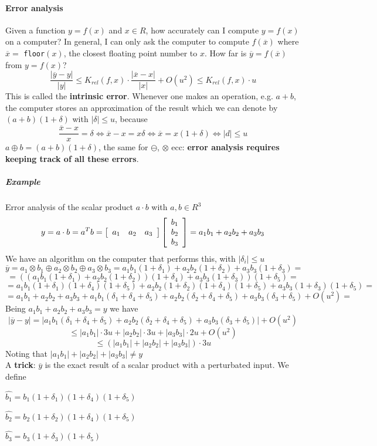 \documentclass[10pt]{report}
\begin{document}
\paragraph{Error analysis} Given a function $y = f(x)$ and $x\in R$, how accurately can I compute $y=f(x)$ on a computer? In general, I can only ask the computer to compute $f(\overline{x})$ where $\overline{x} =$ \texttt{floor}$(x)$, the closest floating point number to $x$. How far is $\overline{y}=f(\overline{x})$ from $y=f(x)$?
$$\frac{|\overline{y}-y|}{|y|}\leq K_{rel}(f,x)\cdot\frac{|\overline{x}-x|}{|x|} + O(u^2)\leq K_{rel}(f,x)\cdot u$$
This is called the \textbf{intrinsic error}. Whenever one makes an operation, e.g. $a+b$, the computer stores an approximation of the result which we can denote by $(a+b)(1+\delta)$ with $|\delta|\leq u$, because $$\frac{\overline{x}-x}{x} = \delta \Leftrightarrow \overline{x} - x = x\delta \Leftrightarrow \overline{x} = x(1+\delta) \Leftrightarrow |d|\leq u$$
$a\oplus b = (a+b)(1+\delta)$, the same for $\ominus$, $\otimes$ ecc: \textbf{error analysis requires keeping track of all these errors}.
\subparagraph{Example} Error analysis of the scalar product $a\cdot b$ with $a,b \in R^3$
$$y = a\cdot b = a^Tb = \left[\begin{array}{c c c}
a_1 & a_2 & a_3
\end{array}\right] \left[\begin{array}{c}
b_1\\b_2\\b_3
\end{array}\right]=a_1b_1+a_2b_2+a_3b_3$$
We have an algorithm on the computer that performs this, with $|\delta_i|\leq u$ $$\overline{y} = a_1\otimes b_1\oplus a_2\otimes b_2\oplus a_3\otimes b_3 = a_1b_1(1+\delta_1)+a_2b_2(1+\delta_2)+a_3b_3(1+\delta_3) = $$
$$ = \left((a_1b_1(1+\delta_1) + a_2b_2(1+\delta_2)) (1+\delta_4) + a_3b_3(1+\delta_3)\right)(1+\delta_5) =$$
$$ = a_1b_1(1+\delta_1)(1+\delta_4)(1+\delta_5) + a_2b_2(1+\delta_2)(1+\delta_4)(1+\delta_5) + a_3b_3(1+\delta_3)(1+\delta_5) = $$
$$ = a_1b_1+a_2b_2+a_3b_3 + a_1b_1(\delta_1+\delta_4+\delta_5) + a_2b_2(\delta_2+\delta_4+\delta_5) + a_3b_3(\delta_3+\delta_5) + O(u^2) = $$
Being $a_1b_1+a_2b_2+a_3b_3 = y$ we have 
$$|\overline{y} - y| = |a_1b_1(\delta_1+\delta_4+\delta_5) + a_2b_2(\delta_2+\delta_4+\delta_5) + a_3b_3(\delta_3+\delta_5)| + O(u^2)$$
$$\leq |a_1b_1|\cdot3u + |a_2b_2|\cdot3u + |a_3b_3|\cdot2u + O(u^2)$$
$$\leq (|a_1b_1|+|a_2b_2|+|a_3b_3|)\cdot 3u$$
Noting that $|a_1b_1|+|a_2b_2|+|a_3b_3|\neq y$\\
A \textbf{trick}: $\overline{y}$ is the exact result of a scalar product with a perturbated input. We define \begin{list}{}{}
	\item $\hat{b_1} = b_1(1+\delta_1)(1+\delta_4)(1+\delta_5)$
	\item $\hat{b_2} = b_2(1+\delta_2)(1+\delta_4)(1+\delta_5)$
	\item $\hat{b_3} = b_3(1+\delta_3)(1+\delta_5)$
\end{list}
\end{document}

